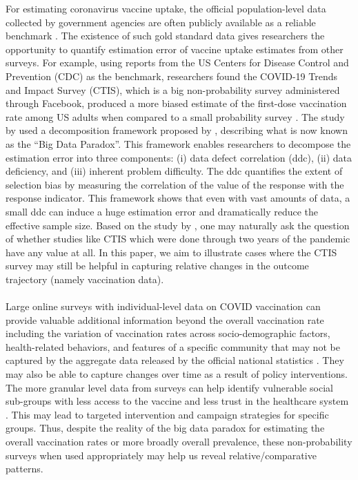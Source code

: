 \documentclass{article}
\begin{document}
For estimating coronavirus vaccine uptake, the official population-level data collected by government agencies are often publicly available as a reliable benchmark \citep{CDC2023, GovernmentOfIndia, Dong2020-or}. The existence of such gold standard data gives researchers the opportunity to quantify estimation error of vaccine uptake estimates from other surveys. For example, using reports from the US Centers for Disease Control and Prevention (CDC) as the benchmark, researchers found the COVID-19 Trends and Impact Survey (CTIS), which is a big non-probability survey administered through Facebook, produced a more biased estimate of the first-dose vaccination rate among US adults when compared to a small probability survey \citep{Bradley2021-io}. The study by \cite{Bradley2021-io} used a decomposition framework proposed by \cite{Meng2018}, describing what is now known as the ``Big Data Paradox''. This framework enables researchers to decompose the estimation error into three components: (i) data defect correlation (ddc), (ii) data deficiency, and (iii) inherent problem difficulty. The ddc quantifies the extent of selection bias by measuring the correlation of the value of the response with the response indicator. This framework shows that even with vast amounts of data, a small ddc can induce a huge estimation error and dramatically reduce the effective sample size. Based on the study by \cite{Bradley2021-io}, one may naturally ask the question of whether studies like CTIS which were done through two years of the pandemic have any value at all. In this paper, we aim to illustrate cases where the CTIS survey may still be helpful in capturing relative changes in the outcome trajectory (namely vaccination data).
\\
\\
Large online surveys with individual-level data on COVID vaccination can provide valuable additional information beyond the overall vaccination rate including the variation of vaccination rates across socio-demographic factors, health-related behaviors, and features of a specific community that may not be captured by the aggregate data released by the official national statistics \citep{Salomon2021-xe, Kush2022, Lupton-Smith2022-lr}. They may also be able to capture changes over time as a result of policy interventions. The more granular level data from surveys can help identify vulnerable social sub-groups with less access to the vaccine and less trust in the healthcare system \citep{McCabe2021-dx, Nguyen2022-sd, McNaghten2022-au, Wang2021-kt}. This may lead to targeted intervention and campaign strategies for specific groups. Thus, despite the reality of the big data paradox for estimating the overall vaccination rates or more broadly overall prevalence, these non-probability surveys when used appropriately may help us reveal relative/comparative patterns.
\end{document}
